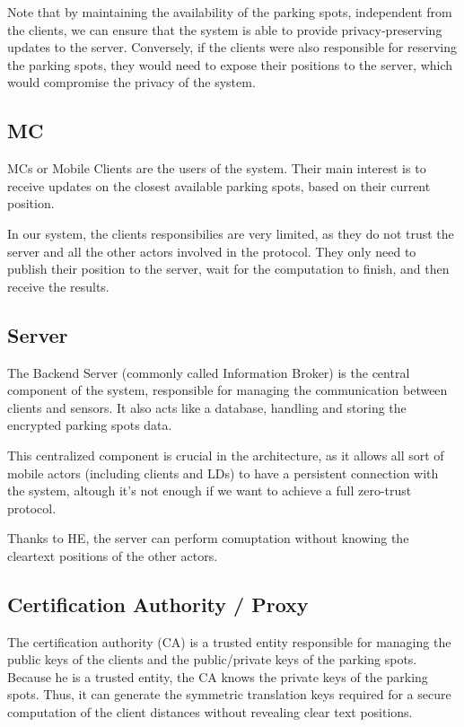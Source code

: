 \documentclass[12pt,a4paper,twoside]{book}
\begin{document}
Note that by maintaining the availability of the parking spots, independent from the clients, we can ensure that the system is able to provide privacy-preserving updates to the server. Conversely, if the clients were also responsible for reserving the parking spots, they would need to expose their positions to the server, which would compromise the privacy of the system.

\subsection{MC}
MCs or Mobile Clients are the users of the system. Their main interest is to receive updates on the closest available parking spots, based on their current position. 

In our system, the clients responsibilies are very limited, as they do not trust the server and all the other actors involved in the protocol. They only need to publish their position to the server, wait for the computation to finish, and then receive the results.

\subsection{Server}
The Backend Server (commonly called Information Broker) is the central component of the system, responsible for managing the communication between clients and sensors. It also acts like a database, handling and storing the encrypted parking spots data.

This centralized component is crucial in the architecture, as it allows all sort of mobile actors (including clients and LDs) to have a persistent connection with the system, altough it's not enough if we want to achieve a full zero-trust protocol.

Thanks to HE, the server can perform comuptation without knowing the cleartext positions of the other actors.

\subsection{Certification Authority / Proxy}
The certification authority (CA) is a trusted entity responsible for managing the public keys of the clients and the public/private keys of the parking spots. Because he is a trusted entity, the CA knows the private keys of the parking spots. Thus, it can generate the symmetric translation keys required for a secure computation of the client distances without revealing clear text positions.
\end{document}

